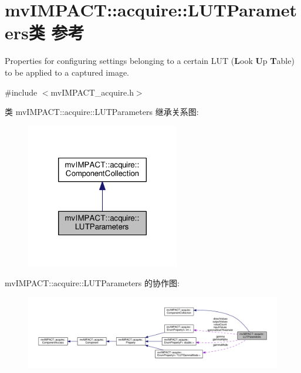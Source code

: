 \hypertarget{classmv_i_m_p_a_c_t_1_1acquire_1_1_l_u_t_parameters}{\section{mv\+I\+M\+P\+A\+C\+T\+:\+:acquire\+:\+:L\+U\+T\+Parameters类 参考}
\label{classmv_i_m_p_a_c_t_1_1acquire_1_1_l_u_t_parameters}
}


Properties for configuring settings belonging to a certain L\+U\+T ({\bfseries L}ook {\bfseries U}p {\bfseries T}able) to be applied to a captured image.  




{\ttfamily \#include $<$mv\+I\+M\+P\+A\+C\+T\+\_\+acquire.\+h$>$}



类 mv\+I\+M\+P\+A\+C\+T\+:\+:acquire\+:\+:L\+U\+T\+Parameters 继承关系图\+:
\nopagebreak
\begin{figure}[H]
\begin{center}
\leavevmode
\includegraphics[width=190pt]{classmv_i_m_p_a_c_t_1_1acquire_1_1_l_u_t_parameters__inherit__graph}
\end{center}
\end{figure}


mv\+I\+M\+P\+A\+C\+T\+:\+:acquire\+:\+:L\+U\+T\+Parameters 的协作图\+:
\nopagebreak
\begin{figure}[H]
\begin{center}
\leavevmode
\includegraphics[width=350pt]{classmv_i_m_p_a_c_t_1_1acquire_1_1_l_u_t_parameters__coll__graph}
\end{center}
\end{figure}
